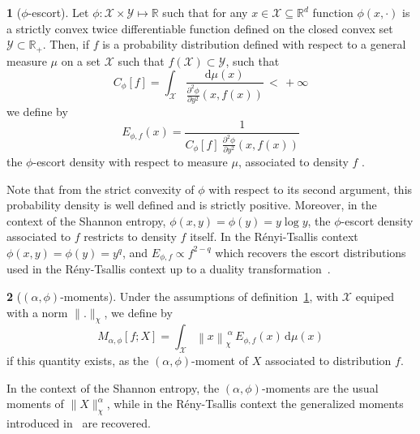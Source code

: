 \documentclass[english,sort&compress]{elsarticle}
\theoremstyle{definition}
\newtheorem{defn}{\protect\definitionname}
\theoremstyle{plain}
\theoremstyle{plain}
\providecommand{\definitionname}{Definition}
\def\dmu{\mathrm{d}\mu}
\def\Rset{\mathbb{R}}
\def\X{\mathcal{X}}
\def\Y{\mathcal{Y}}
\begin{document}
\begin{defn}[$\phi$-escort]\label{def:phi-escort}
  Let $\phi: \X \times  \Y \mapsto \Rset$ such that for any  $x \in \X \subseteq
  \Rset^d$ function  $\phi(x,\cdot)$ is  a strictly convex  twice differentiable
  function defined on the closed convex  set $\Y \subset \Rset_+$.  Then, if $f$
  is a probability distribution defined  with respect to a general measure $\mu$
  on a set $\X$ such that $f(\X) \subset \Y$, such that
  \begin{equation}
\label{eq:Cphi}
  C_\phi[f]    =     \int_\X    \frac{\dmu(x)}{\frac{\partial^2    \phi}{\partial
      y^2}(x,f(x))} \, < \, + \infty
  \end{equation}
  we define by
  \begin{equation}\label{eq:phi-escort}
    E_{\phi,f}(x) = \frac{1}{\displaystyle C_\phi[f] \: \frac{\partial^2
    \phi}{\partial y^2}(x,f(x))}
  \end{equation}
  the $\phi$-escort density with respect to measure $\mu$, associated to density
  $f$ .
\end{defn}
%
Note  that from  the  strict convexity  of  $\phi$ with  respect  to its  second
argument,   this  probability   density  is   well  defined   and   is  strictly
positive. Moreover, in the context  of the Shannon entropy, $\phi(x,y) = \phi(y)
= y  \log y$, the $\phi$-escort  density associated to $f$  restricts to density
$f$  itself. In the  R\'enyi-Tsallis context  $\phi(x,y) =  \phi(y) =  y^q$, and
$E_{\phi,f} \propto f^{2-q}$ which recovers the escort distributions used in the
R\'eny-Tsallis context up to a duality transformation~\cite{Nau11}.


\begin{defn}[$(\alpha,\phi)$-moments]\label{def:phi-moment}
  Under  the assumptions of  definition~\ref{def:phi-escort}, with  $\X$ equiped
  with a norm $\|.\|_\chi$, we define by
  \begin{equation}\label{eq:phi-moment}
  M_{\alpha,\phi}[f;X] = \int_\X \left\| x \right\|_\chi^{\: \alpha} \,
  E_{\phi,f}(x) \, \dmu(x)
  \end{equation}
  if this  quantity exists, as  the $(\alpha,\phi)$-moment of $X$  associated to
  distribution $f$.
\end{defn}
%
In the context of the Shannon entropy, the $(\alpha,\phi)$-moments are the usual
moments  of  $\|X\|_\chi^\alpha$,  while   in  the  R\'eny-Tsallis  context  the
generalized moments introduced in~\cite{TsaMen98,MarNic00} are recovered.
\end{document}

